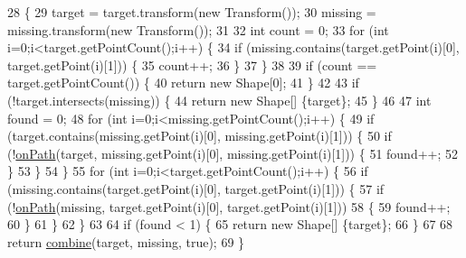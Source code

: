 \begin{DoxyCode}
28                                                          \{  
29         target = target.transform(\textcolor{keyword}{new} Transform());
30         missing = missing.transform(\textcolor{keyword}{new} Transform());
31 
32         \textcolor{keywordtype}{int} count = 0;
33         \textcolor{keywordflow}{for} (\textcolor{keywordtype}{int} i=0;i<target.getPointCount();i++) \{
34             \textcolor{keywordflow}{if} (missing.contains(target.getPoint(i)[0], target.getPoint(i)[1])) \{
35                 count++;
36             \}
37         \}
38         
39         \textcolor{keywordflow}{if} (count == target.getPointCount()) \{
40             \textcolor{keywordflow}{return} \textcolor{keyword}{new} Shape[0];
41         \}
42         
43         \textcolor{keywordflow}{if} (!target.intersects(missing)) \{
44             \textcolor{keywordflow}{return} \textcolor{keyword}{new} Shape[] \{target\};
45         \}
46         
47         \textcolor{keywordtype}{int} found = 0;
48         \textcolor{keywordflow}{for} (\textcolor{keywordtype}{int} i=0;i<missing.getPointCount();i++) \{
49             \textcolor{keywordflow}{if} (target.contains(missing.getPoint(i)[0], missing.getPoint(i)[1])) \{
50                 \textcolor{keywordflow}{if} (!\mbox{\hyperlink{classorg_1_1newdawn_1_1slick_1_1geom_1_1_geom_util_aa1a89ad4cb34e2520cfbd7f1514637ff}{onPath}}(target, missing.getPoint(i)[0], missing.getPoint(i)[1])) \{
51                     found++;
52                 \}
53             \}
54         \}
55         \textcolor{keywordflow}{for} (\textcolor{keywordtype}{int} i=0;i<target.getPointCount();i++) \{
56             \textcolor{keywordflow}{if} (missing.contains(target.getPoint(i)[0], target.getPoint(i)[1])) \{
57                 \textcolor{keywordflow}{if} (!\mbox{\hyperlink{classorg_1_1newdawn_1_1slick_1_1geom_1_1_geom_util_aa1a89ad4cb34e2520cfbd7f1514637ff}{onPath}}(missing, target.getPoint(i)[0], target.getPoint(i)[1])) 
58                 \{
59                     found++;
60                 \}
61             \}
62         \}
63         
64         \textcolor{keywordflow}{if} (found < 1) \{
65             \textcolor{keywordflow}{return} \textcolor{keyword}{new} Shape[] \{target\};
66         \}
67         
68         \textcolor{keywordflow}{return} \mbox{\hyperlink{classorg_1_1newdawn_1_1slick_1_1geom_1_1_geom_util_a3f61c5128808d5737d963c353910d3e5}{combine}}(target, missing, \textcolor{keyword}{true});
69     \}
\end{DoxyCode}
\mbox{\label{classorg_1_1newdawn_1_1slick_1_1geom_1_1_geom_util_abd70f51dcab6a08d1eb94c708d9ad7d9}} 
